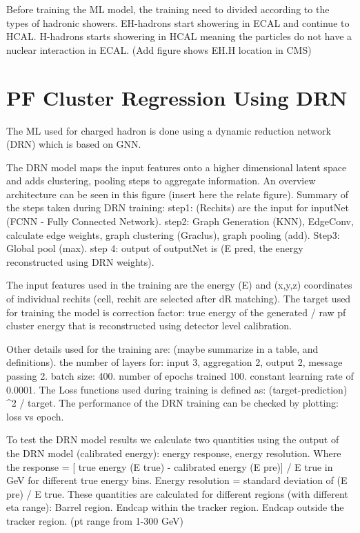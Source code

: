 Before training the ML model, the training need to divided according to the types of hadronic showers. EH-hadrons start showering in ECAL and continue to HCAL. H-hadrons starts showering in HCAL meaning the particles do not have a nuclear interaction in ECAL. (Add figure shows EH.H location in CMS)

\section{PF Cluster Regression Using DRN}
The ML used for charged hadron is done using a dynamic reduction network (DRN) which is based on GNN. %

The DRN model maps the input features onto a higher dimensional latent space and adds clustering, pooling steps to aggregate information. An overview architecture can be seen in this figure (insert here the relate figure). Summary of the steps taken during DRN training: 
step1: (Rechits) are the input for inputNet (FCNN - Fully Connected Network). 
step2: Graph Generation (KNN), EdgeConv, calculate edge weights, graph clustering (Graclus), graph pooling (add). 
Step3: Global pool (max).  
step 4: output of outputNet is (E pred, the energy reconstructed using DRN weights).

The input features used in the training are the energy (E) and (x,y,z) coordinates of individual rechits (cell, rechit are selected after dR matching). The target used for training the model is correction factor:  true energy of the generated / raw pf cluster energy that is reconstructed using detector level calibration.

Other details used for the training are:  (maybe summarize in a table, and definitions).  
the number of layers for: input 3, aggregation 2, output 2, message passing 2.  
batch size: 400. 
number of epochs trained 100. 
constant learning rate of 0.0001.  
The Loss functions used during training is defined as: (target-prediction) ^2 / target.  
The performance of the DRN training can be checked by plotting: loss vs epoch.

To test the DRN model results we calculate two quantities using the output of the DRN model (calibrated energy): energy response, energy resolution.  
Where the response = [ true energy (E true) - calibrated energy (E pre)] / E true in GeV for different true energy bins. Energy resolution = standard deviation of (E pre) / E true.  
These quantities are calculated for different regions (with different eta range): Barrel region. Endcap within the tracker region. Endcap outside the tracker region. (pt range from 1-300 GeV)

